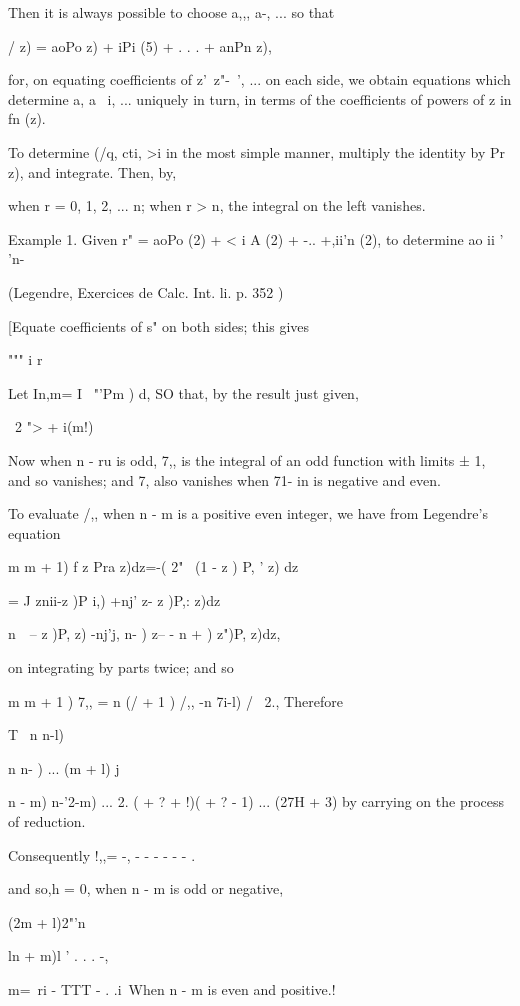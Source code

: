 {Then it is always possible to choose a,,, a-, ... so that

/ z) = aoPo z) + iPi (5) + . . . + anPn z),

for, on equating coefficients of z'\ z"-~', ... on each side, we
obtain equations which determine a, a \ i, ... uniquely in turn, in
terms of the coefficients of powers of z in fn (z).

To determine (/q, cti,  >i in the most simple manner, multiply the
identity by Pr z), and integrate. Then, by,

when r = 0, 1, 2, ... n; when r > n, the integral on the left
vanishes.

Example 1. Given r" = aoPo (2) + < i A (2) + -.. +,ii'n (2), to
determine ao ii  ' 'n-

(Legendre, Exercices de Calc. Int. li. p. 352 )

[Equate coefficients of s" on both sides; this gives

""" i r 

Let In,m= I ~"'Pm ) d, SO that, by the result just given,

\ 2 "> + i(m!)

Now when n - ru is odd, 7,, is the integral of an odd function with
limits ± 1, and so vanishes; and 7, also vanishes when 71- in is
negative and even.

To evaluate /,, when n - m is a positive even integer, we have from
Legendre's equation

m m + 1) f z Pra z)dz=-( 2" \ (1 - z ) P, ' z) dz

= J znii-z )P i,) +nj' z- z )P,: z)dz

  n\ \ -- z )P, z) -nj'j, n- ) z-- - n + ) z")P, z)dz,

on integrating by parts twice; and so

m m + 1 ) 7,, = n (/ + 1 ) /,, -n 7i-l) / \ 2., Therefore

T \ n n-l)

n n- ) ... (m + l) j

 n - m) n-'2-m) ... 2. ( + ? + !)( + ? - 1) ... (27H + 3) by carrying
on the process of reduction.

%
%

Consequently !,,= -, - - - - - - .

and so,h = 0, when n - m is odd or negative,

(2m + l)2"'n\ \ {ln + m)l ' . . . -,

 m=~ri - TTT - . .i\, When n - m is even and positive.!

}}
